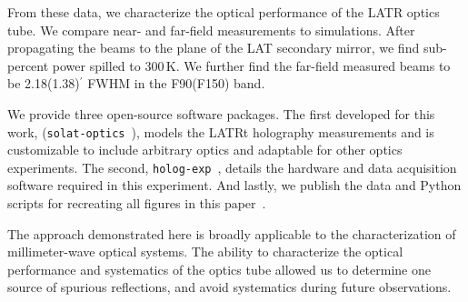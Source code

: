 From these data, we characterize the optical performance of the LATR optics tube.  We compare near- and far-field measurements to simulations.  After propagating the beams to the plane of the LAT secondary mirror, we find sub-percent power spilled to 300\,K.  We further find the far-field measured beams to be 2.18(1.38)$^{\prime}$ FWHM in the F90(F150) band.

We provide three open-source software packages.  The first developed for this work, (\verb|solat-optics|~\cite{holog_sim_model}), models the LATRt holography measurements and is customizable to include arbitrary optics and adaptable for other optics experiments.  The second, \verb|holog-exp|~\cite{holog-exp}, details the hardware and data acquisition software required in this experiment.  And lastly, we publish the data and Python scripts for recreating all figures in this paper~\cite{knowledge}.

The approach demonstrated here is broadly applicable to the characterization of millimeter-wave optical systems.  The ability to characterize the optical performance and systematics of the optics tube allowed us to determine one source of spurious reflections, and avoid systematics during future observations. 